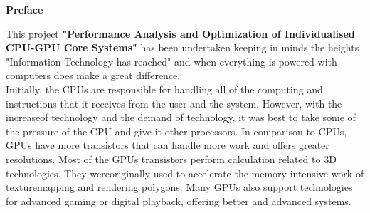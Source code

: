 \newpage
{\bf \LARGE Preface}
\vspace{3cm}
\label{preface}

This project \textbf{"Performance Analysis and Optimization of Individualised CPU-GPU Core Systems"} has been undertaken keeping in minds the heights "Information Technology has reached" and when everything is powered with computers does make a great difference. \\

Initially, the CPUs are responsible for handling all of the computing and instructions that it receives from the user and the system. However, with the increaseof technology and the demand of technology, it was best to take some of the pressure of the CPU and give it other processors. In comparison to CPUs, GPUs have more transistors that can handle more work and offers greater resolutions. Most of the GPUs transistors perform calculation related to 3D technologies. They wereoriginally used to accelerate the memory-intensive work of texturemapping and rendering polygons. Many GPUs also support technologies for advanced gaming or digital playback, offering better and advanced systems. \\


